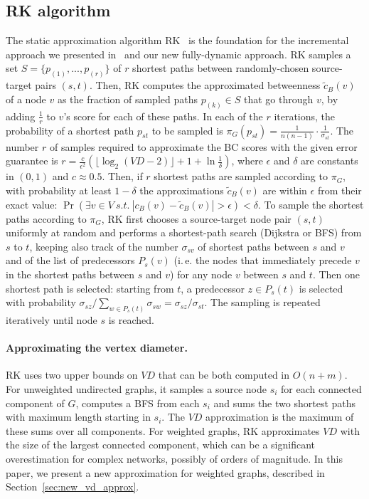 \documentclass[english]{llncs}
\newcommand{\ie}{i.\,e.\xspace}
\newcommand{\vd}{$\mathit{VD}$\xspace}
\newcommand{\rk}{\textsf{RK}\xspace}
\begin{document}
\subsection{\rk algorithm}
\label{sec:rk}
The static approximation algorithm \rk~\cite{DBLP:conf/wsdm/RiondatoK14} is
the foundation for the incremental approach we presented in~\cite{DBLP:conf/alenex/BergaminiMS15} and our new fully-dynamic approach. \rk samples a set $S =\{p_{(1)},...,p_{(r)}\}$ of $r$ shortest paths between randomly-chosen source-target pairs $(s, t)$.
Then, \rk computes the approximated
betweenness $\tilde{c}_B(v)$ of a node $v$ as the
fraction of sampled paths $p_{(k)}\in S$ that go through $v$, by adding $\frac{1}{r}$ to $v$'s score for each of these paths.
In each of the $r$ iterations, the probability of a shortest path $p_{st}$ to be sampled is $\pi_{G}(p_{st})=\frac{1}{n(n-1)}\cdot\frac{1}{\sigma_{st}}$. The number $r$ of samples required to approximate the BC scores with the given error guarantee is $r=\frac{c}{\epsilon^{2}}\left(\lfloor\log_{2}\left(\mathit{VD}-2\right)\rfloor+1+\ln\frac{1}{\delta}\right)$, where $\epsilon$ and $\delta$ are constants in $(0,1)$ and $c \approx 0.5$.
Then, if $r$ shortest paths
are sampled according to $\pi_{G}$, with probability at least $1-\delta$ the approximations
$\tilde{c}_B(v)$ are within $\epsilon$
from their exact value: $ \Pr(\exists v\in V\: s.t.\:|c_{B}(v)-\tilde{c}_B(v)|>\epsilon)<\delta. $
To sample the shortest paths according to $\pi_{G}$, \rk first chooses
a source-target node pair $(s,t)$ uniformly at random and performs a shortest-path search (Dijkstra or BFS) from $s$ to $t$, keeping also track of the number $\sigma_{sv}$
of shortest paths between $s$ and $v$ and of the list of predecessors
$P_{s}(v)$ (\ie the nodes that immediately precede $v$ in the shortest paths between $s$ and $v$) for any node $v$ between $s$ and $t$. Then one shortest path is selected: 
starting from $t$, a predecessor $z\in P_{s}(t)$
is selected with probability $\sigma_{sz}/\sum_{w\in P_{s}(t)}\sigma_{sw}=\sigma_{sz}/\sigma_{st}$.
The sampling is repeated iteratively
until node $s$ is reached.
\paragraph{Approximating the vertex diameter.}
\rk uses two upper bounds on \vd that can be both computed in $O(n+m)$. For unweighted undirected graphs, it samples a source node $s_i$ for each connected component of $G$, computes a BFS from each $s_i$ and sums the two shortest paths with maximum length starting in $s_i$. The \vd approximation is the maximum of these sums over all components. For weighted graphs, \rk approximates \vd with the size of the largest connected component, which can be a significant overestimation for complex networks, possibly of orders of magnitude. In this paper, we present a new approximation for weighted graphs, described in Section~\ref{sec:new_vd_approx}.
\end{document}
